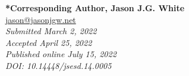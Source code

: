 \documentclass[11pt]{sig-alternate}
\begin{document}



\textbf{*Corresponding Author, Jason J.G. White}\\
\href{mailto:jason@jasonjgw.net}{jason@jasonjgw.net}\\
\textit{Submitted March 2, 2022 }\\
\textit{Accepted April 25, 2022}\\
\textit{Published online July 15, 2022}\\
\textit{DOI: 10.14448/jsesd.14.0005}\\


\pagebreak
\pagebreak

\vspace{5mm}
\section*{\vspace{140mm}}
\end{document}
